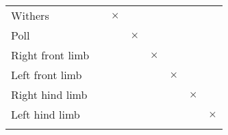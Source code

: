 \begin{table}[htb]
{\begin{tabular}[H]{p{2.5cm}m{1cm}m{1cm}m{1cm}m{1cm}m{1cm}m{1cm}m{1cm}}
                        \multicolumn{1}{l}{Withers}    & &  \multicolumn{1}{c}{\Large{$\times$}} & & & & &\\ [0.3 em]
                        
                            \multicolumn{1}{l}{Poll}    & &  &  \multicolumn{1}{c}{\Large{$\times$}} & & & &\\ [0.3 em]
                            
                                \multicolumn{1}{l}{Right front limb}  &  & &  &  \multicolumn{1}{c}{\Large{$\times$}} & & &\\ [0.3 em]
                                
                                    \multicolumn{1}{l}{Left front limb} & &  & &  &  \multicolumn{1}{c}{\Large{$\times$}} & &\\ [0.3 em]
                                    
                                        \multicolumn{1}{l}{Right hind limb} & &  & &  & & \multicolumn{1}{c}{\Large{$\times$}} & \\ [0.3 em]
                                        
                                            \multicolumn{1}{l}{Left hind limb} & & & & & & & \multicolumn{1}{c}{\Large{$\times$}}\\ [0.3 em]
        \bottomrule
    \label{featuresetdefintion}
\end{tabular}}
\vspace{-10mm}
\end{table}